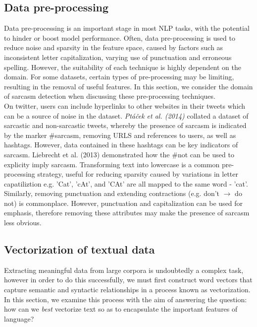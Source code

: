 \documentclass[12pt,a4paper]{article}
\begin{document}
\subsection{Data pre-processing}
\noindent Data pre-processing is an important stage in most NLP tasks, with the potential to hinder or boost model performance. Often, data pre-processing is used to reduce noise and sparsity in the feature space, caused by factors such as inconsistent letter capitalization, varying use of punctuation and erroneous spelling. However, the suitability of each technique is highly dependent on the domain. For some datasets, certain types of pre-processing may be limiting, resulting in the removal of useful features. In this section, we consider the domain of sarcasm detection when discussing these pre-processing techniques.\\

\noindent On twitter, users can include hyperlinks to other websites in their tweets which can be a source of noise in the dataset. \textit{Pt{\'a}{\v{c}ek et al. (2014)}} \cite{ptavcek2014sarcasm} collated a dataset of sarcastic and non-sarcastic tweets, whereby the presence of sarcasm is indicated by the marker \#sarcasm, removing URLS and references to users, as well as hashtags. However, data contained in these hashtags can be key indicators of sarcasm. Liebrecht et al. (2013) \cite{liebrecht2013perfect} demonstrated how the \#not can be used to explicity imply sarcasm. Transforming text into lowercase is a common pre-processing strategy, useful for reducing sparsity caused by variations in letter capatiliztion e.g. 'Cat', 'cAt', and 'CAt' are all mapped to the same word - 'cat'. Similarly, removing punctuation and extending contractions (e.g. don't $\rightarrow$ do not) is commonplace. However, punctuation and capitalization can be used for emphasis, therefore removing these attributes may make the presence of sarcasm less obvious.
\vfill

\subsection{Vectorization of textual data}
\noindent Extracting meaningful data from large corpora is undoubtedly a complex task, however in order to do this successfully, we must first construct word vectors that capture semantic and syntactic relationships in a process known as vectorization. In this section, we examine this process with the aim of answering the question: how can we \textit{best} vectorize text so as to encapsulate the important features of language?
\end{document}
